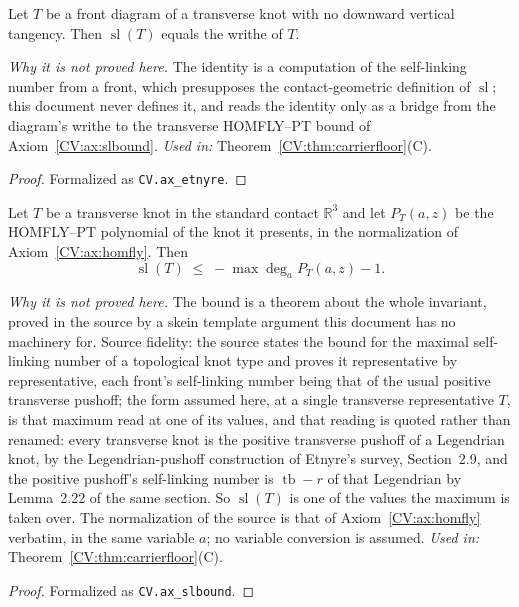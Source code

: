 \begin{theorem}\label{CV:ax:etnyre}\leanok
Let $T$ be a front diagram of a transverse knot with no downward vertical
tangency. Then $\operatorname{sl}(T)$ equals the writhe of $T$.

\emph{Why it is not proved here.} The identity is a computation of the
self-linking number from a front, which presupposes the contact-geometric
definition of $\operatorname{sl}$; this document never defines it, and reads
the identity only as a bridge from the diagram's writhe to the transverse
HOMFLY--PT bound of Axiom~\ref{CV:ax:slbound}.
\emph{Used in:} Theorem~\ref{CV:thm:carrierfloor}(C).
\end{theorem}
\begin{proof}\leanok{}
Formalized as \texttt{CV.ax\_etnyre}.
\end{proof}

\begin{theorem}\label{CV:ax:slbound}\leanok
Let $T$ be a transverse knot in the standard contact $\mathbb R^3$ and let
$P_T(a,z)$ be the HOMFLY--PT polynomial of the knot it presents, in the
normalization of Axiom~\ref{CV:ax:homfly}. Then
\[
   \operatorname{sl}(T)\;\leq\;-\max\deg_a P_T(a,z)-1 .
\]

\emph{Why it is not proved here.} The bound is a theorem about the whole
invariant, proved in the source by a skein template argument this document has
no machinery for. Source fidelity: the source states the bound for the maximal
self-linking number of a topological knot type and proves it representative by
representative, each front's self-linking number being that of the usual
positive transverse pushoff; the form assumed here, at a single transverse
representative $T$, is that maximum read at one of its values, and that
reading is quoted rather than renamed: every transverse knot is the positive
transverse pushoff of a Legendrian knot, by the Legendrian-pushoff
construction of Etnyre's survey, Section~2.9, and the positive pushoff's
self-linking number is $\operatorname{tb}-r$ of that Legendrian by Lemma~2.22
of the same section.  So $\operatorname{sl}(T)$ is one of the values the
maximum is taken over. The normalization of the source is that of Axiom~\ref{CV:ax:homfly}
verbatim, in the same variable $a$; no variable conversion is assumed.
\emph{Used in:} Theorem~\ref{CV:thm:carrierfloor}(C).
\end{theorem}
\begin{proof}\leanok{}
Formalized as \texttt{CV.ax\_slbound}.
\end{proof}

